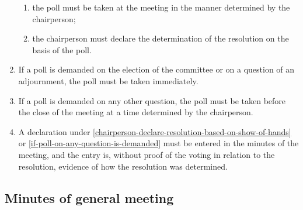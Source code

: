 \documentclass[../constitution.tex]{subfiles}
\begin{document}
\begin{enumerate}
\begin{enumerate}
  \item the poll must be taken at the meeting in the manner determined by the chairperson;
  \item the chairperson must declare the determination of the resolution on the basis of the poll.
  \end{enumerate}
\item If a poll is demanded on the election of the committee  or on a question of an adjournment, the poll must be taken immediately.
\item If a poll is demanded on any other question, the poll must be taken before the close of the meeting at a time determined by the chairperson.
\item A declaration under  \ref{chairperson-declare-resolution-based-on-show-of-hands} or \ref{if-poll-on-any-question-is-demanded} must be entered in the minutes of the meeting, and the entry is, without proof of the voting in relation to the resolution, evidence of how the resolution was determined.
\end{enumerate}

\hypertarget{minutes-of-general-meeting}{%
\subsection{Minutes of general meeting}\label{minutes-of-general-meeting}}
\end{document}
